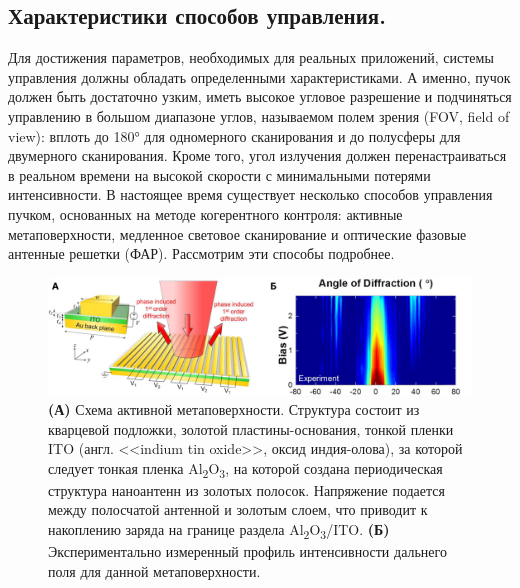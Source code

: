\subsection{Характеристики способов управления.}
Для достижения параметров, необходимых для реальных приложений, системы управления должны обладать определенными характеристиками. А именно, пучок должен быть достаточно узким, иметь высокое угловое разрешение и подчиняться управлению в большом диапазоне углов, называемом полем зрения (FOV, field of view): вплоть до 180° для одномерного сканирования и до полусферы для двумерного сканирования. Кроме того, угол излучения должен перенастраиваться в реальном времени на высокой скорости с минимальными потерями интенсивности. В настоящее время существует несколько способов управления пучком, основанных на методе когерентного контроля: активные метаповерхности, медленное световое сканирование и оптические фазовые антенные решетки (ФАР). Рассмотрим эти способы подробнее.

\begin{figure}
    \begin{center}
        \includegraphics[width=\textwidth]{pictures/Metasurfaces.png}
        \caption{\textbf{(А)} Схема активной метаповерхности. Структура состоит из
            кварцевой подложки, золотой пластины-основания, тонкой пленки ITO (англ. <<indium tin oxide>>, оксид индия-олова), за которой следует тонкая пленка Al\textsubscript{2}O\textsubscript{3}, на которой создана периодическая структура наноантенн из золотых полосок. Напряжение подается между полосчатой антенной и золотым слоем, что приводит к накоплению заряда на границе раздела Al\textsubscript{2}O\textsubscript{3}/ITO\cite{huang2016gate}. \textbf{(Б)} Экспериментально измеренный профиль интенсивности дальнего поля для данной метаповерхности\cite{huang2016gate}.}
        \label{fig:metasurfaces}
    \end{center}

\end{figure}


